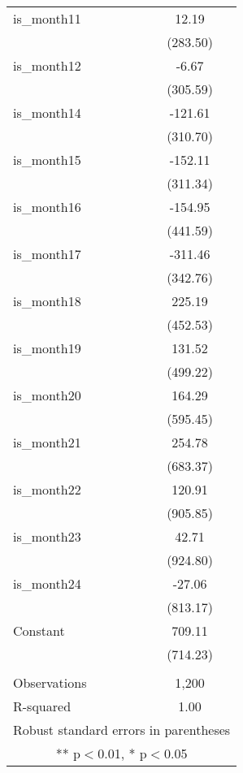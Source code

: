 \begin{tabular}{lc}
is\_month11 & 12.19 \\
 & (283.50) \\
is\_month12 & -6.67 \\
 & (305.59) \\
is\_month14 & -121.61 \\
 & (310.70) \\
is\_month15 & -152.11 \\
 & (311.34) \\
is\_month16 & -154.95 \\
 & (441.59) \\
is\_month17 & -311.46 \\
 & (342.76) \\
is\_month18 & 225.19 \\
 & (452.53) \\
is\_month19 & 131.52 \\
 & (499.22) \\
is\_month20 & 164.29 \\
 & (595.45) \\
is\_month21 & 254.78 \\
 & (683.37) \\
is\_month22 & 120.91 \\
 & (905.85) \\
is\_month23 & 42.71 \\
 & (924.80) \\
is\_month24 & -27.06 \\
 & (813.17) \\
Constant & 709.11 \\
 & (714.23) \\
 &  \\
Observations & 1,200 \\
 R-squared & 1.00 \\ \hline
\multicolumn{2}{c}{ Robust standard errors in parentheses} \\
\multicolumn{2}{c}{ ** p$<$0.01, * p$<$0.05} \\
\end{tabular}
